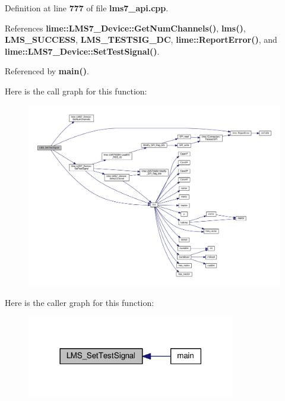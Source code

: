 Definition at line {\bf 777} of file {\bf lms7\+\_\+api.\+cpp}.



References {\bf lime\+::\+L\+M\+S7\+\_\+\+Device\+::\+Get\+Num\+Channels()}, {\bf lms()}, {\bf L\+M\+S\+\_\+\+S\+U\+C\+C\+E\+SS}, {\bf L\+M\+S\+\_\+\+T\+E\+S\+T\+S\+I\+G\+\_\+\+DC}, {\bf lime\+::\+Report\+Error()}, and {\bf lime\+::\+L\+M\+S7\+\_\+\+Device\+::\+Set\+Test\+Signal()}.



Referenced by {\bf main()}.



Here is the call graph for this function\+:
\nopagebreak
\begin{figure}[H]
\begin{center}
\leavevmode
\includegraphics[width=350pt]{df/de1/lms7__api_8cpp_ac9e743da5a20e2b337238e94644b2c1a_cgraph}
\end{center}
\end{figure}




Here is the caller graph for this function\+:
\nopagebreak
\begin{figure}[H]
\begin{center}
\leavevmode
\includegraphics[width=258pt]{df/de1/lms7__api_8cpp_ac9e743da5a20e2b337238e94644b2c1a_icgraph}
\end{center}
\end{figure}


